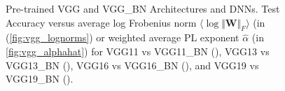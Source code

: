 \begin{figure}[t]
{      \label{fig:vgg_alphahat}
   }
   \caption{%
      Pre-trained VGG and VGG\_BN Architectures and DNNs.  
      Test Accuracy versus
      average log Frobenius norm $\langle\log\Vert\mathbf{W}\Vert_{F}\rangle$ (in (\ref{fig:vgg_lognorms})
      or
      weighted average PL exponent $\hat{\alpha}$ (in \ref{fig:vgg_alphahat})
      for
      VGG11 vs VGG11\_BN ({\color{blue}{blue}}),
      VGG13 vs VGG13\_BN ({\color{orange}{orange}}),
      VGG16 vs VGG16\_BN ({\color{green}{green}}),  and
      VGG19 vs VGG19\_BN ({\color{red}{red}}). 
   }
   \label{fig:vgg}
\end{figure}





